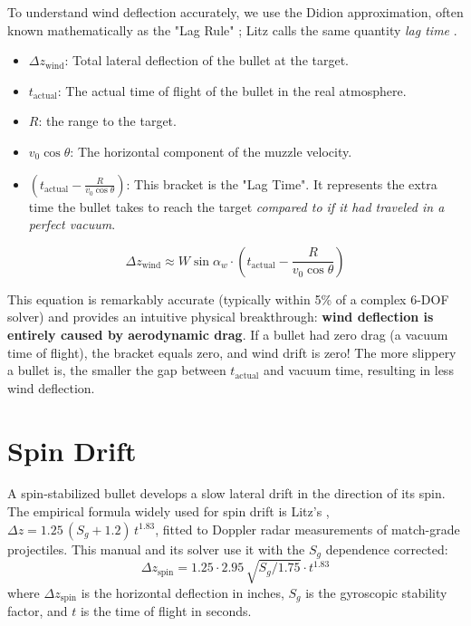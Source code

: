 \documentclass[11pt,twoside,openright]{report}
\begin{document}
To understand wind deflection accurately, we use the Didion approximation, often known mathematically as the "Lag Rule" \citep{mccoy1999modern}; Litz calls the same quantity \emph{lag time} \citep[p.~63]{litz2015applied}.

\begin{itemize}[noitemsep]
    \item $\Delta z_{\mathrm{wind}}$: Total lateral deflection of the bullet at the target.
    \item $t_{\mathrm{actual}}$: The actual time of flight of the bullet in the real atmosphere.
    \item $R$: the range to the target.
    \item $v_0\cos\theta$: The horizontal component of the muzzle velocity.
    \item $\left(t_{\mathrm{actual}} - \frac{R}{v_0\cos\theta}\right)$: This bracket is the "Lag Time". It represents the extra time the bullet takes to reach the target \emph{compared to if it had traveled in a perfect vacuum}.
\end{itemize}

\begin{equation}
  \Delta z_{\mathrm{wind}} \approx W\sin\alpha_w \cdot \left(t_{\mathrm{actual}} - \frac{R}{v_0\cos\theta}\right)
  \label{eq:lag_rule}
\end{equation}

This equation is remarkably accurate (typically within 5\% of a complex 6-DOF solver) and provides an intuitive physical breakthrough: \textbf{wind deflection is entirely caused by aerodynamic drag}. If a bullet had zero drag (a vacuum time of flight), the bracket equals zero, and wind drift is zero! The more slippery a bullet is, the smaller the gap between $t_{\mathrm{actual}}$ and vacuum time, resulting in less wind deflection.

\section{Spin Drift}
\label{sec:spin_drift}

A spin-stabilized bullet develops a slow lateral drift in the direction of its spin. The empirical formula widely used for spin drift is Litz's \citep[eq.~6.1, p.~97]{litz2015applied}, $\Delta z = 1.25\,(S_g + 1.2)\,t^{1.83}$, fitted to Doppler radar measurements of match-grade projectiles. This manual and its solver use it with the $S_g$ dependence corrected:
\begin{equation}
  \boxed{\Delta z_{\mathrm{spin}} = 1.25 \cdot 2.95\,\sqrt{S_g/1.75} \cdot t^{1.83}}
  \label{eq:spin_drift}
\end{equation}
where $\Delta z_{\mathrm{spin}}$ is the horizontal deflection in inches, $S_g$ is the gyroscopic stability factor, and $t$ is the time of flight in seconds.
\end{document}

